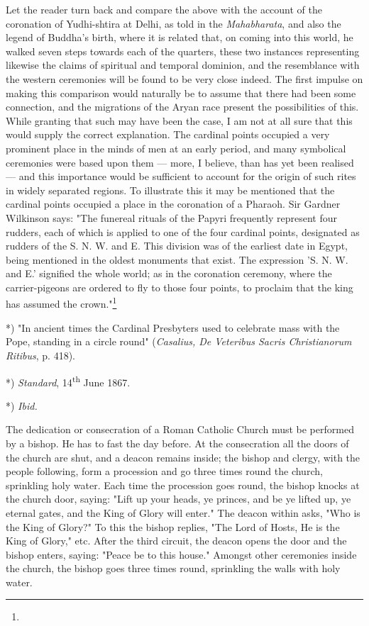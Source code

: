 \documentclass[a4paper, 11pt, oneside, polutonikogreek, english]{article}
\begin{document}
Let the reader turn back and compare the above with the account of the coronation of Yudhi-shtira at Delhi, as told in the \emph{Mahabharata}, and also the legend of Buddha's birth, where it is related that, on coming into this world, he walked seven steps towards each of the quarters, these two instances representing likewise the claims of spiritual and temporal dominion, and the resemblance with the western ceremonies will be found to be very close indeed. The first impulse on making this comparison would naturally be to assume that there had been some connection, and the migrations of the Aryan race present the possibilities of this. While granting that such may have been the case, I am not at all sure that this would supply the correct explanation. The cardinal points occupied a very prominent place in the minds of men at an early period, and many symbolical ceremonies were based upon them --- more, I believe, than has yet been realised --- and this importance would be sufficient to account for the origin of such rites in widely separated regions. To illustrate this it may be mentioned that the cardinal points occupied a place in the coronation of a Pharaoh. Sir Gardner Wilkinson says: "The funereal rituals of the Papyri frequently represent four rudders, each of which is applied to one of the four cardinal points, designated as rudders of the S. N. W. and E. This division was of the earliest date in Egypt, being mentioned in the oldest monuments that exist. The expression 'S. N. W. and E.' signified the whole world; as in the coronation ceremony, where the carrier-pigeons are ordered to fly to those four points, to proclaim that the king has assumed the crown."\footnote{}

*) "In ancient times the Cardinal Presbyters used to celebrate mass with the Pope, standing in a circle round" (\emph{Casalius, De Veteribus Sacris Christianorum Ritibus}, p. 418).

*) \emph{Standard}, 14\textsuperscript{th} June 1867.

*) \emph{Ibid.}

The dedication or consecration of a Roman Catholic Church must be performed by a bishop. He has to fast the day before. At the consecration all the doors of the church are shut, and a deacon remains inside; the bishop and clergy, with the people following, form a procession and go three times round the church, sprinkling holy water. Each time the procession goes round, the bishop knocks at the church door, saying: "Lift up your heads, ye princes, and be ye lifted up, ye eternal gates, and the King of Glory will enter." The deacon within asks, "Who is the King of Glory?" To this the bishop replies, "The Lord of Hosts, He is the King of Glory," etc. After the third circuit, the deacon opens the door and the bishop enters, saying: "Peace be to this house." Amongst other ceremonies inside the church, the bishop goes three times round, sprinkling the walls with holy water.
\end{document}
